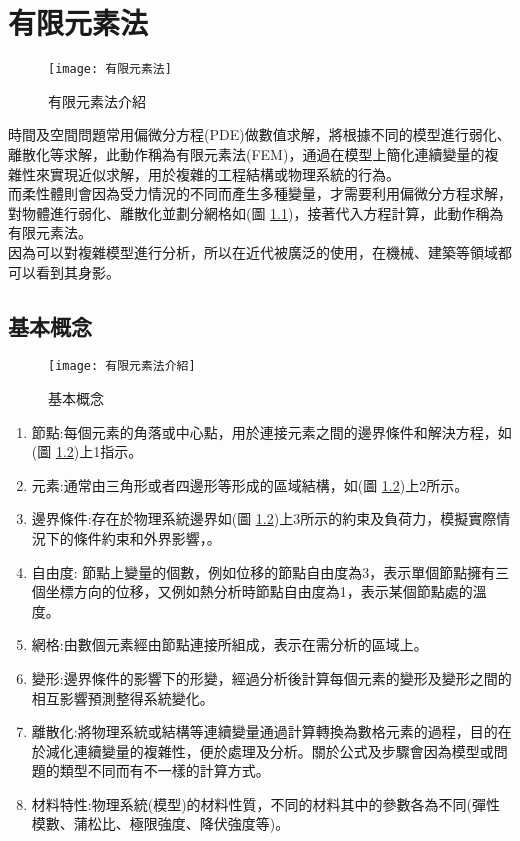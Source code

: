 \chapter{有限元素法}

\begin{figure}[hbt!]
\begin{center}
\texttt{[image: 有限元素法]}
\caption{\Large 有限元素法介紹}\label{有限元素法}
\end{center}
\end{figure}
時間及空間問題常用偏微分方程(PDE)做數值求解，將根據不同的模型進行弱化、離散化等求解，此動作稱為有限元素法(FEM)，通過在模型上簡化連續變量的複雜性來實現近似求解，用於複雜的工程結構或物理系統的行為。\\

而柔性體則會因為受力情況的不同而產生多種變量，才需要利用偏微分方程求解，對物體進行弱化、離散化並劃分網格如(圖 \ref{有限元素法})，接著代入方程計算，此動作稱為有限元素法。\\

因為可以對複雜模型進行分析，所以在近代被廣泛的使用，在機械、建築等領域都可以看到其身影。
\newpage
\section{基本概念}


\begin{figure}[hbt!]
\begin{center}
\texttt{[image: 有限元素法介紹]}
\caption{\Large 基本概念}\label{有限元素法介紹}
\end{center}
\end{figure}

\begin{enumerate}
\item 節點:每個元素的角落或中心點，用於連接元素之間的邊界條件和解決方程，如(圖 \ref{有限元素法介紹})上1指示。
\item 元素:通常由三角形或者四邊形等形成的區域結構，如(圖 \ref{有限元素法介紹})上2所示。
\item 邊界條件:存在於物理系統邊界如(圖 \ref{有限元素法介紹})上3所示的約束及負荷力，模擬實際情況下的條件約束和外界影響，。
\item 自由度: 節點上變量的個數，例如位移的節點自由度為3，表示單個節點擁有三個坐標方向的位移，又例如熱分析時節點自由度為1，表示某個節點處的溫度。
\item 網格:由數個元素經由節點連接所組成，表示在需分析的區域上。
\item 變形:邊界條件的影響下的形變，經過分析後計算每個元素的變形及變形之間的相互影響預測整得系統變化。
\item 離散化:將物理系統或結構等連續變量通過計算轉換為數格元素的過程，目的在於減化連續變量的複雜性，便於處理及分析。關於公式及步驟會因為模型或問題的類型不同而有不一樣的計算方式。
\item 材料特性:物理系統(模型)的材料性質，不同的材料其中的參數各為不同(彈性模數、蒲松比、極限強度、降伏強度等)。\\
\end{enumerate}

